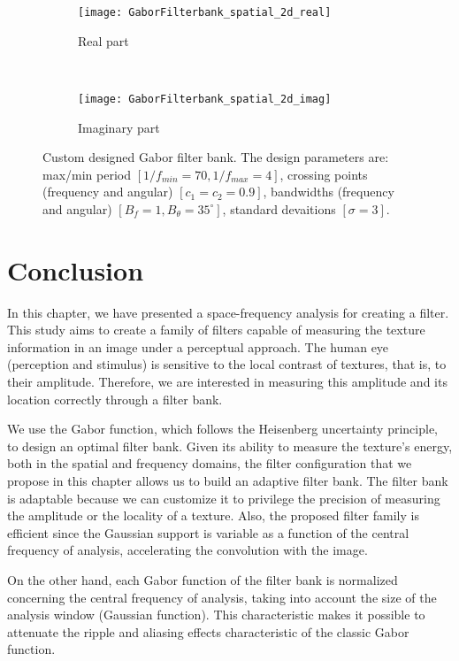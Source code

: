 \begin{figure}[!ht]
	\centering
	\begin{subfigure}[b]{0.8\textwidth}
		\texttt{[image: GaborFilterbank\_spatial\_2d\_real]}
		\caption{Real part}
		\label{fig:2d_filterbank_real}
	\end{subfigure}\\
	\begin{subfigure}[b]{0.8\textwidth}
		\centering
		\texttt{[image: GaborFilterbank\_spatial\_2d\_imag]}
		\caption{Imaginary part}
		\label{fig:2d_filterbank_imag}
	\end{subfigure}
	    
    \caption{Custom designed Gabor filter bank. The design parameters are: max/min period $[1/f_{min}=70, 1/f_{max}=4]$, crossing points (frequency and angular) $[c_1=c_2= 0.9]$, bandwidths (frequency and angular) $[B_f=1, B_{\theta} = 35^{\circ}]$, standard devaitions $[\sigma=3]$.}\label{fig:2d_filterbank}
\end{figure}

\section{Conclusion}

In this chapter, we have presented a space-frequency analysis for creating a filter. This study aims to create a family of filters capable of measuring the texture information in an image under a perceptual approach. The human eye (perception and stimulus) is sensitive to the local contrast of textures, that is, to their amplitude. Therefore, we are interested in measuring this amplitude and its location correctly through a filter bank.

We use the Gabor function, which follows the Heisenberg uncertainty principle, to design an optimal filter bank. Given its ability to measure the texture's energy, both in the spatial and frequency domains, the filter configuration that we propose in this chapter allows us to build an adaptive filter bank. The filter bank is adaptable because we can customize it to privilege the precision of measuring the amplitude or the locality of a texture. Also, the proposed filter family is efficient since the Gaussian support is variable as a function of the central frequency of analysis, accelerating the convolution with the image.

On the other hand, each Gabor function of the filter bank is normalized concerning the central frequency of analysis, taking into account the size of the analysis window (Gaussian function). This characteristic makes it possible to attenuate the ripple and aliasing effects characteristic of the classic Gabor function.

